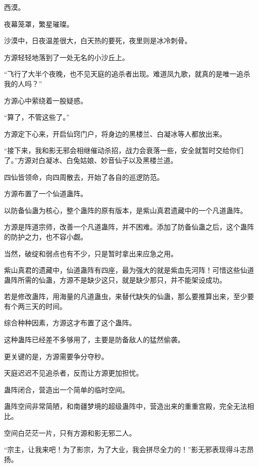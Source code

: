 
\begin{this_body}



西漠。

夜幕笼罩，繁星璀璨。

沙漠中，日夜温差很大，白天热的要死，夜里则是冰冷刺骨。

方源轻轻地落到了一处无名的小沙丘上。

“飞行了大半个夜晚，也不见天庭的追杀者出现。难道凤九歌，就真的是唯一追杀我的人吗？”

方源心中萦绕着一股疑惑。

“算了，不管这些了。”

方源定下心来，开启仙窍门户，将身边的黑楼兰、白凝冰等人都放出来。

“接下来，我和影无邪会相继催动杀招，战力会衰落一些，安全就暂时交给你们了。”方源对白凝冰、白兔姑娘、妙音仙子以及黑楼兰道。

四仙皆领命，向四周散去，开始了各自的巡逻防范。

方源布置了一个仙道蛊阵。

以防备仙蛊为核心，整个蛊阵的原有版本，是紫山真君遗藏中的一个凡道蛊阵。

方源是阵道宗师，改善一个凡道蛊阵，并不困难。添加了防备仙蛊之后，这个蛊阵的防护之力，也不容小觑。

当然，破绽和弱点也有不少，只是暂时拿出来应急之用。

紫山真君的遗藏中，仙道蛊阵有四座，最为强大的就是紫血先河阵！可惜这些仙道蛊阵所需的仙蛊，方源不是缺少这只，就是缺少那只，并不能架设成功。

若是修改蛊阵，用海量的凡道蛊虫，来替代缺失的仙蛊，那么要推算出来，至少要有个两三天的时间。

综合种种因素，方源这才布置了这个蛊阵。

这种蛊阵已经差不多够用了，主要是防备敌人的猛然偷袭。

更关键的是，方源需要争分夺秒。

天庭迟迟不见追杀者，反而让方源更加担忧。

蛊阵闭合，营造出一个简单的临时空间。

蛊阵空间非常简陋，和南疆梦境的超级蛊阵中，营造出来的重重宫殿，完全无法相比。

空间白茫茫一片，只有方源和影无邪二人。

“宗主，让我来吧！为了影宗，为了大业，我会拼尽全力的！”影无邪表现得斗志昂扬。


\end{this_body}
